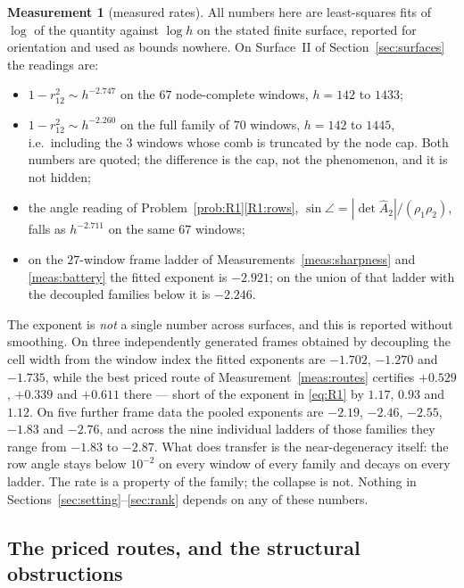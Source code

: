 \documentclass[11pt,a4paper]{article}
\theoremstyle{plain}
\theoremstyle{definition}
\newtheorem{measurement}[theorem]{Measurement}
\newcommand{\Ah}{\widehat{A}}
\begin{document}
\begin{measurement}[measured rates]
\label{meas:rate}
All numbers here are least-squares fits of $\log$ of the quantity against
$\log h$ on the stated finite surface, reported for orientation and used as
bounds nowhere. On Surface~II of Section~\ref{sec:surfaces} the readings are:
\begin{itemize}
\item $1-r_{12}^{2}\sim h^{-2.747}$ on the $67$ node-complete windows,
  $h=142$ to $1433$;
\item $1-r_{12}^{2}\sim h^{-2.260}$ on the full family of $70$ windows,
  $h=142$ to $1445$, i.e.\ including the $3$ windows whose comb is truncated by
  the node cap. Both numbers are quoted; the difference is the cap, not the
  phenomenon, and it is not hidden;
\item the angle reading of Problem~\ref{prob:R1}\ref{R1:rows},
  $\sin\angle=|\det\Ah_2|/(\rho_1\rho_2)$, falls as $h^{-2.711}$ on the same
  $67$ windows;
\item on the $27$-window frame ladder of Measurements~\ref{meas:sharpness} and
  \ref{meas:battery} the fitted exponent is $-2.921$; on the union of that
  ladder with the decoupled families below it is $-2.246$.
\end{itemize}
The exponent is \emph{not} a single number across surfaces, and this is reported
without smoothing. On three independently generated frames obtained by
decoupling the cell width from the window index the fitted exponents are
$-1.702$, $-1.270$ and $-1.735$, while the best priced route of
Measurement~\ref{meas:routes} certifies $+0.529$, $+0.339$ and $+0.611$ there
--- short of the exponent in \eqref{eq:R1} by $1.17$, $0.93$ and $1.12$. On five
further frame data the pooled exponents are $-2.19$, $-2.46$, $-2.55$, $-1.83$
and $-2.76$, and across the nine individual ladders of those families they
range from $-1.83$ to $-2.87$. What does transfer is the near-degeneracy itself:
the row angle stays below $10^{-2}$ on every window of every family and decays
on every ladder. The rate is a property of the family; the collapse is not.
Nothing in Sections~\ref{sec:setting}--\ref{sec:rank} depends on any of these
numbers.
\end{measurement}

\subsection{The priced routes, and the structural obstructions}
\label{sec:nogo}
\end{document}
